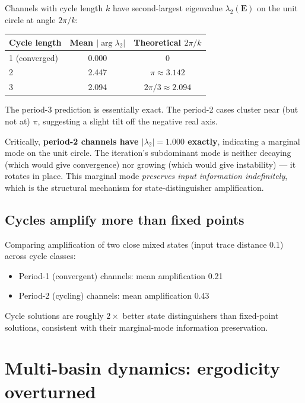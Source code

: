 \documentclass[11pt,a4paper]{article}
\begin{document}
Channels with cycle length $k$ have second-largest eigenvalue
$\lambda_2(\mathbf{E})$ on the unit circle at angle $2\pi/k$:

\begin{center}
\begin{tabular}{lcc}
\toprule
Cycle length & Mean $|\arg \lambda_2|$ & Theoretical $2\pi/k$ \\
\midrule
1 (converged) & 0.000 & 0 \\
2 & 2.447 & $\pi \approx 3.142$ \\
3 & 2.094 & $2\pi/3 \approx 2.094$ \\
\bottomrule
\end{tabular}
\end{center}

The period-3 prediction is essentially exact. The period-2 cases
cluster near (but not at) $\pi$, suggesting a slight tilt off the
negative real axis.

Critically, \textbf{period-2 channels have $|\lambda_2| = 1.000$
exactly}, indicating a marginal mode on the unit circle. The
iteration's subdominant mode is neither decaying (which would give
convergence) nor growing (which would give instability) --- it
rotates in place. This marginal mode \emph{preserves input
information indefinitely}, which is the structural mechanism for
state-distinguisher amplification.

\subsection*{Cycles amplify more than fixed points}

Comparing amplification of two close mixed states (input trace
distance $0.1$) across cycle classes:

\begin{itemize}
\item Period-1 (convergent) channels: mean amplification 0.21
\item Period-2 (cycling) channels: mean amplification 0.43
\end{itemize}

Cycle solutions are roughly $2\times$ better state distinguishers
than fixed-point solutions, consistent with their marginal-mode
information preservation.

\section{Multi-basin dynamics: ergodicity overturned}
\end{document}
